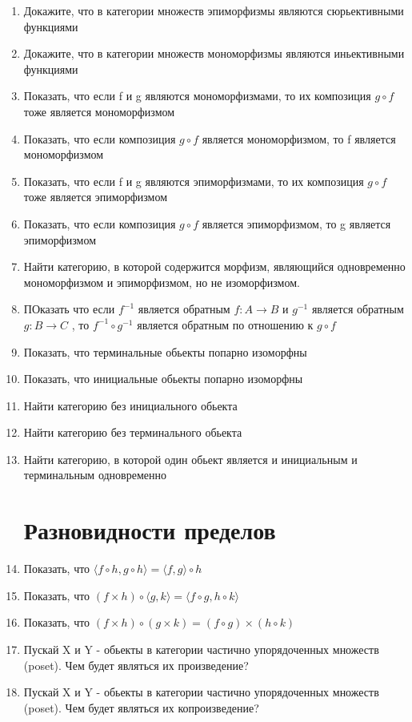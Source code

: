 \documentclass[12pt,a4paper]{article}
\begin{document}
\begin{enumerate}
\item Докажите, что в категории множеств эпиморфизмы являются сюрьективными функциями

\item Докажите, что в категории множеств мономорфизмы являются иньективными функциями

\item Показать, что если f и g являются мономорфизмами, то их композиция $g \circ f$ тоже является мономорфизмом

\item Показать, что если композиция $g \circ f$ является мономорфизмом, то f является мономорфизмом

\item Показать, что если f и g являются эпиморфизмами, то их композиция $g \circ f$ тоже является эпиморфизмом

\item Показать, что если композиция $g \circ f$ является эпиморфизмом, то g является эпиморфизмом

\item Найти категорию, в которой содержится морфизм, являющийся одновременно мономорфизмом и эпиморфизмом, но не изоморфизмом.

\item ПОказать что если $f^{-1}$ является обратным $f : A \rightarrow B$ и $g^{-1}$ является обратным $g : B \rightarrow C$ , то $f^{-1} \circ g^{-1}$ является обратным по отношению к $g \circ f$
\item Показать, что терминальные обьекты попарно изоморфны

\item Показать, что инициальные обьекты попарно изоморфны

\item Найти категорию без инициального обьекта
\item Найти категорию без терминального обьекта
\item Найти категорию, в которой один обьект является и инициальным и терминальным одновременно

\section{Разновидности пределов}
\item Показать, что $\langle f \circ h , g \circ h \rangle = \langle f,g \rangle \circ h$
\item Показать, что $(f \times h) \circ \langle g,k \rangle = \langle f \circ g , h \circ k \rangle $
\item Показать, что $(f \times h) \circ (g \times k) = (f \circ g) \times (h \circ k)$

\item Пускай X и Y - обьекты в категории частично упорядоченных множеств (poset). Чем будет являться их произведение?

\item Пускай X и Y - обьекты в категории частично упорядоченных множеств (poset). Чем будет являться их копроизведение?



\end{enumerate}
\end{document}
